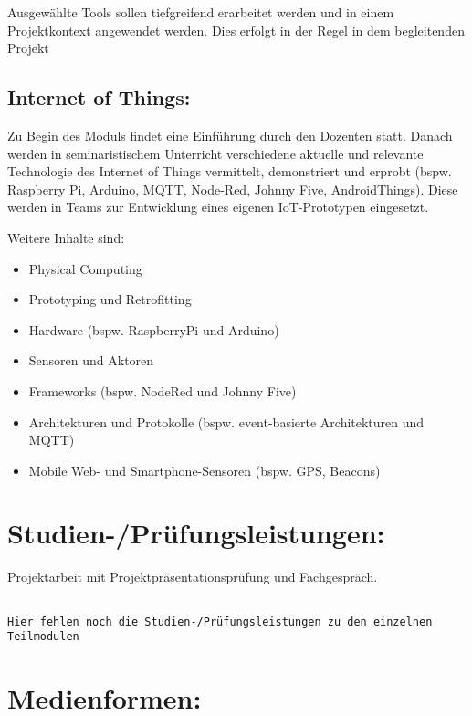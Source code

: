 Ausgewählte Tools sollen tiefgreifend erarbeitet werden und in einem
Projektkontext angewendet werden. Dies erfolgt in der Regel in dem
begleitenden Projekt

\subsection*{Internet of Things:}\label{internet-of-things-1}

Zu Begin des Moduls findet eine Einführung durch den Dozenten statt.
Danach werden in seminaristischem Unterricht verschiedene aktuelle und
relevante Technologie des Internet of Things vermittelt, demonstriert
und erprobt (bspw. Raspberry Pi, Arduino, MQTT, Node-Red, Johnny Five,
AndroidThings). Diese werden in Teams zur Entwicklung eines eigenen
IoT-Prototypen eingesetzt.

Weitere Inhalte sind:

\begin{itemize}
\tightlist
\item
  Physical Computing
\item
  Prototyping und Retrofitting
\item
  Hardware (bspw. RaspberryPi und Arduino)
\item
  Sensoren und Aktoren
\item
  Frameworks (bspw. NodeRed und Johnny Five)
\item
  Architekturen und Protokolle (bspw. event-basierte Architekturen und
  MQTT)
\item
  Mobile Web- und Smartphone-Sensoren (bspw. GPS, Beacons)
\end{itemize}

\section*{Studien-/Prüfungsleistungen:}\label{studien-pruxfcfungsleistungen-24}

Projektarbeit mit Projektpräsentationsprüfung und Fachgespräch.

\begin{verbatim}

Hier fehlen noch die Studien-/Prüfungsleistungen zu den einzelnen Teilmodulen
\end{verbatim}

\section*{Medienformen:}\label{medienformen-17}

